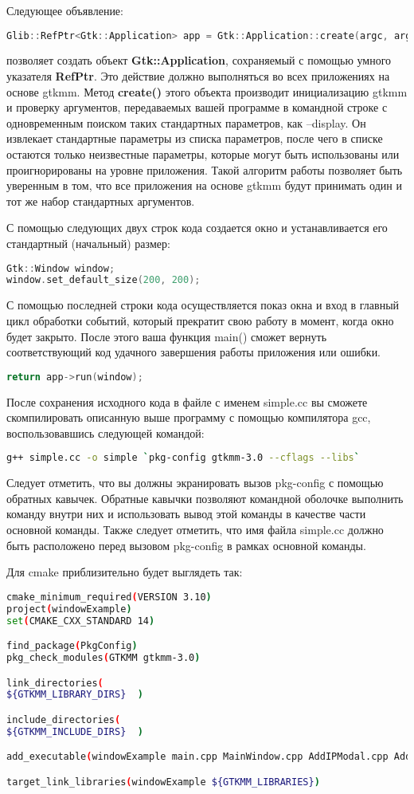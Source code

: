Следующее объявление: 
\begin{lstlisting}[language=C++]
Glib::RefPtr<Gtk::Application> app = Gtk::Application::create(argc, argv, "org.gtkmm.examples.base");
\end{lstlisting}
позволяет создать объект \textbf{Gtk::Application}, сохраняемый с помощью умного указателя \textbf{RefPtr}. Это действие должно выполняться во всех приложениях на основе gtkmm. Метод \textbf{create()} этого объекта производит инициализацию gtkmm и проверку аргументов, передаваемых вашей программе в командной строке с одновременным поиском таких стандартных параметров, как --display. Он извлекает стандартные параметры из списка параметров, после чего в списке остаются только неизвестные параметры, которые могут быть использованы или проигнорированы на уровне приложения. Такой алгоритм работы позволяет быть уверенным в том, что все приложения на основе gtkmm будут принимать один и тот же набор стандартных аргументов. 

С помощью следующих двух строк кода создается окно и устанавливается его стандартный (начальный) размер: 
\begin{lstlisting}[language=C++]
Gtk::Window window;
window.set_default_size(200, 200);
\end{lstlisting}
С помощью последней строки кода осуществляется показ окна и вход в главный цикл обработки событий, который прекратит свою работу в момент, когда окно будет закрыто. После этого ваша функция main() сможет вернуть соответствующий код удачного завершения работы приложения или ошибки. 
\begin{lstlisting}[language=C++]
return app->run(window);
\end{lstlisting}
После сохранения исходного кода в файле с именем simple.cc вы сможете скомпилировать описанную выше программу с помощью компилятора gcc, воспользовавшись следующей командой:
\begin{lstlisting}[language=bash]
g++ simple.cc -o simple `pkg-config gtkmm-3.0 --cflags --libs`
\end{lstlisting}
Следует отметить, что вы должны экранировать вызов pkg-config с помощью обратных кавычек. Обратные кавычки позволяют командной оболочке выполнить команду внутри них и использовать вывод этой команды в качестве части основной команды. Также следует отметить, что имя файла simple.cc должно быть расположено перед вызовом pkg-config в рамках основной команды. 

Для cmake приблизительно будет выглядеть так: 
\begin{lstlisting}[language=bash]
cmake_minimum_required(VERSION 3.10)
project(windowExample)
set(CMAKE_CXX_STANDARD 14)

find_package(PkgConfig)
pkg_check_modules(GTKMM gtkmm-3.0)

link_directories(
${GTKMM_LIBRARY_DIRS}  )

include_directories(
${GTKMM_INCLUDE_DIRS}  )

add_executable(windowExample main.cpp MainWindow.cpp AddIPModal.cpp AddIPModal.h)

target_link_libraries(windowExample ${GTKMM_LIBRARIES})
\end{lstlisting}

